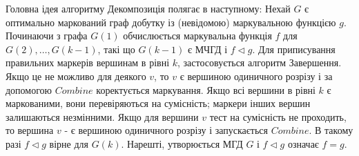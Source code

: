 Головна ідея алгоритму Декомпозиція полягає в наступному: Нехай $G$ є оптимально маркований граф добутку із (невідомою) маркувальною функцією $g$.
Починаючи з графа $G(1)$ обчислюється маркувальна функція $f$ для $G(2),\dots,G(k-1)$, такі що $G(k-1)$ є МЧГД і $f \triangleleft g$.
Для приписування правильних маркерів вершинам в рівні $k$, застосовується алгоритм Завершення.
Якщо це не можливо для деякого $v$, то $v$ є вершиною одиничного розрізу і за допомогою $Combine$ коректується маркування.
Якщо всі вершини в рівні $k$ є маркованими, вони перевіряються на сумісність; маркери інших вершин залишаються незмінними.
Якщо для вершини $v$ тест на сумісність не проходить, то вершина $v$ - є вершиною одиничного розрізу і запускається $Combine$.
В такому разі $f \triangleleft g$ вірне для $G(k)$.
Нарешті, утворюється МГД $G$ і $f \triangleleft g$ означає $f=g$.






